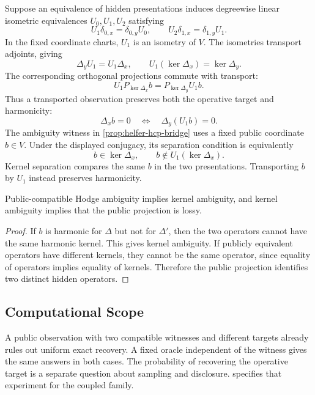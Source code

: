 Suppose an equivalence of hidden presentations induces degreewise linear
isometric equivalences
\(U_0,U_1,U_2\) satisfying
\[
  U_1\delta_{0,x}=\delta_{0,y}U_0,
  \qquad
  U_2\delta_{1,x}=\delta_{1,y}U_1.
\]
In the fixed coordinate charts, \(U_1\) is an isometry of \(V\). The
isometries transport adjoints, giving
\[
  \Delta_yU_1=U_1\Delta_x,
  \qquad
  U_1(\ker\Delta_x)=\ker\Delta_y.
\]
The corresponding orthogonal projections commute with transport:
\[
  U_1P_{\ker\Delta_x}b
  =
  P_{\ker\Delta_y}U_1b.
\]
Thus a transported observation preserves both the operative target and
harmonicity:
\[
  \Delta_xb=0
  \quad\Longleftrightarrow\quad
  \Delta_y(U_1b)=0.
\]
The ambiguity witness in \cref{prop:helfer-hcp-bridge} uses a fixed public
coordinate \(b\in V\). Under the displayed conjugacy, its separation condition is
equivalently
\[
  b\in\ker\Delta_x,
  \qquad
  b\notin U_1(\ker\Delta_x).
\]
Kernel separation compares the same \(b\) in the two presentations.
Transporting \(b\) by \(U_1\) instead preserves harmonicity.

\begin{proposition}\label{prop:ambiguity-hierarchy}
  Public-compatible Hodge ambiguity implies kernel ambiguity, and kernel
  ambiguity implies that the public projection is lossy.
\end{proposition}

\begin{proof}
  If \(b\) is harmonic for \(\Delta\) but not for \(\Delta'\), then the two
  operators cannot have the same harmonic kernel. This gives kernel ambiguity.
  If publicly equivalent operators have different kernels, they cannot be the
  same operator, since equality of operators implies equality of kernels.
  Therefore the public projection identifies two distinct hidden operators.
\end{proof}

\subsection{Computational Scope}\label{sec:computational-scope}

A public observation with two compatible witnesses and different targets
already rules out uniform exact recovery. A fixed oracle independent of the
witness gives the same answers in both cases. The probability of recovering
the operative target is a separate question about sampling and disclosure.
 specifies that experiment for the coupled
family.
